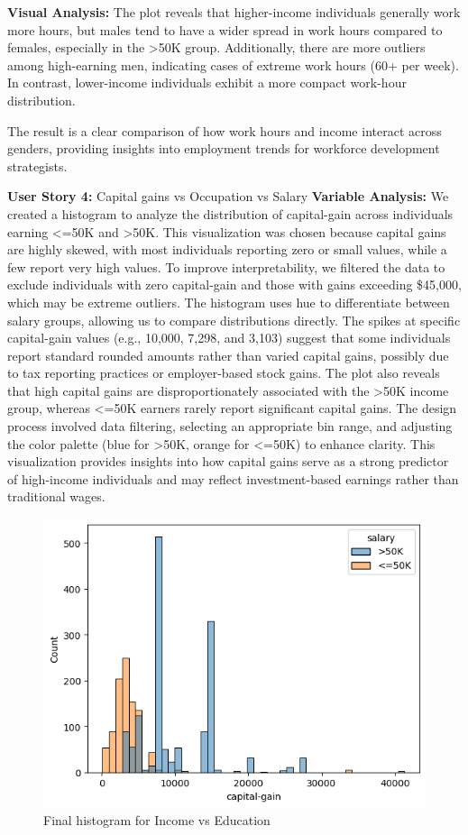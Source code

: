 \documentclass[journal,onecolumn]{IEEEtran}
\begin{document}
\textbf{Visual Analysis:} 
The plot reveals that higher-income individuals generally work more hours, 
but males tend to have a wider spread in work hours compared to females, 
especially in the >50K group. Additionally, there are more outliers among high-earning men,
indicating cases of extreme work hours (60+ per week). 
In contrast, lower-income individuals exhibit a more compact work-hour distribution.

The result is a clear comparison of how work hours and income interact 
across genders, providing insights into employment trends for workforce development strategists.

\textbf{User Story 4:} Capital gains vs Occupation vs Salary
\textbf{Variable Analysis:} 
We created a histogram to analyze the distribution of capital-gain across
individuals earning <=50K and >50K. This visualization was chosen because
capital gains are highly skewed, with most individuals reporting zero or
small values, while a few report very high values. To improve interpretability,
we filtered the data to exclude individuals with zero capital-gain and
those with gains exceeding \$45,000, which may be extreme outliers.
The histogram uses hue to differentiate between salary groups, allowing us to compare distributions directly.
The spikes at specific capital-gain values (e.g., 10,000, 7,298, and 3,103) suggest that some
individuals report standard rounded amounts rather than varied capital gains,
possibly due to tax reporting practices or employer-based stock gains.
The plot also reveals that high capital gains are disproportionately associated
with the >50K income group, whereas <=50K earners rarely report significant
capital gains. The design process involved data filtering, selecting an
appropriate bin range, and adjusting the color palette (blue for >50K, orange for <=50K)
to enhance clarity. This visualization provides insights into how capital
gains serve as a strong predictor of high-income individuals and may
reflect investment-based earnings rather than traditional wages.

\begin{figure}[h]
    \centering
    \includegraphics[width=0.9\linewidth]{capital-gain.png}  %
    \caption{Final histogram for Income vs Education}
    \label{fig:final_income_vs_education}
\end{figure}
\end{document}
